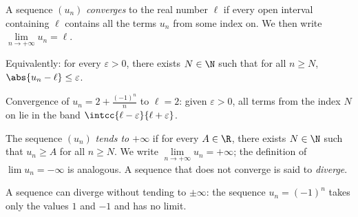 \begin{definition}\label{def:tle:seq:limit}
A sequence $(u_n)$ \emph{converges} to the real
number $\ell$ if every open interval containing $\ell$ contains all the terms
$u_n$ from some index on. We then write $\lim\limits_{n\to+\infty} u_n = \ell$.

Equivalently: for every $\varepsilon > 0$, there exists $N \in \N$ such that
for all $n \geq N$, $\abs{u_n - \ell} \leq \varepsilon$.
\end{definition}

\begin{omfigure}

{\small Convergence of $u_n = 2 + \frac{(-1)^n}{n}$ to $\ell = 2$: given
$\varepsilon > 0$, all terms from the index $N$ on lie in the band
$\intcc{\ell-\varepsilon}{\ell+\varepsilon}$.}
\end{omfigure}

\begin{definition}\label{def:tle:seq:infinity}
The sequence $(u_n)$ \emph{tends to $+\infty$} if for every $A \in \R$, there
exists $N \in \N$ such that $u_n \geq A$ for all $n \geq N$. We write
$\lim\limits_{n\to+\infty} u_n = +\infty$; the definition of
$\lim u_n = -\infty$ is analogous. A sequence that does not converge is said
to \emph{diverge}.
\end{definition}

\begin{remark}
A sequence can diverge without tending to $\pm\infty$: the sequence
$u_n = (-1)^n$ takes only the values $1$ and $-1$ and has no limit.
\end{remark}

